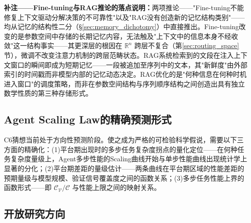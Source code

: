 \documentclass[11pt,a4paper]{article}
\theoremstyle{definition}
\newcommand{\verifspace}{\mathcal{C}_{\mathcal{V}}}
\newcommand{\taskcspace}{\mathcal{C}}
\begin{document}
\textbf{补注——Fine-tuning与RAG推论的落点说明：}两项推论——"Fine-tuning不能修复上下文驱动分解决策的不可靠性"以及"RAG没有创造新的记忆结构类别"——均从记忆的结构性二分（\S\ref{sec:memory_dichotomy}）中直接推出。Fine-tuning改变的是参数空间中存储的长期记忆内容，无法触及"上下文中的信息本身不经收敛"这一结构事实——其更深层的根因在 $\mathbb{R}^n$ 跨层不复合（第\ref{sec:routing_space}节），微调不改变注意力机制的跨层范畴状态。RAG系统检索到的文段在注入上下文窗口的瞬间即成为短期记忆——一段被追加至序列中的文本，其"新鲜度"由外部索引的时间戳而非模型内部的记忆动态决定。RAG优化的是"何种信息在何种时机进入窗口"的调度策略，而非在参数空间结构与序列顺序结构之间创造出具有独立数学性质的第三种存储形式。

\subsection{Agent Scaling Law的精确预测形式}

C6猜想当前处于方向性预测阶段。使之成为严格的可检验科学假说，需要以下三方面的精确化：(1)平台期出现时的多步任务复杂度拐点的量化定位——在何种任务复杂度量级上，Agent多步性能的Scaling曲线开始与单步性能曲线出现统计学上显著的分化；(2)平台期差距的量级估计——两条曲线在平台期区域的性能差距的预期量级与模型规模、验证信号覆盖度之间的函数关系；(3)多步任务性能上界的函数形式——即 $\verifspace/\taskcspace$ 与性能上限之间的映射关系。

\subsection{开放研究方向}
\end{document}
